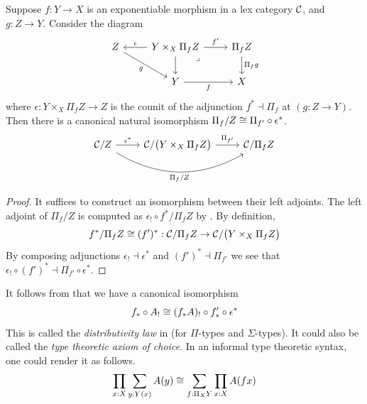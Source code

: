 \begin{lemma} \label{lem:pullback-morphism-action}
  Suppose $f : Y \to X$ is an exponentiable morphism
  in a lex category $\mathcal{C}$,
  and $g : Z \to Y$.
  Consider the diagram
  \[\begin{tikzcd}
    Z & {Y \times_X \Pi_f Z} & {\Pi_f Z} \\
    & Y & X
    \arrow["g"', from=1-1, to=2-2]
    \arrow["{\epsilon}"', from=1-2, to=1-1]
    \arrow["{f'}", from=1-2, to=1-3]
    \arrow[from=1-2, to=2-2]
    \arrow["\lrcorner"{anchor=center, pos=0.125}, draw=none, from=1-2, to=2-3]
    \arrow["{\Pi_f g}", from=1-3, to=2-3]
    \arrow["f"', from=2-2, to=2-3]
  \end{tikzcd}\]
  where $\epsilon : Y \times_X \Pi_f Z \to Z$
  is the counit of the adjunction $f^* \dashv \Pi_f$ at $(g : Z \to Y)$.
  Then there is a canonical natural isomorphism
  $\Pi_f/Z \cong \Pi_{f'} \circ \epsilon^*$.
  \begin{equation} \label{diag:pullback-morphism-action}
    \begin{tikzcd}
      {\CC / Z} & {\CC / \big( Y \times_X \Pi_f Z \big)} & {\CC / \Pi_f Z}
      \arrow["{{\epsilon^*}}", from=1-1, to=1-2]
      \arrow["{{\Pi_{f'}}}", from=1-2, to=1-3]
      \arrow["{{\Pi_f/Z}}"', from=1-1, to=1-3, bend right]
    \end{tikzcd}
  \end{equation}
\end{lemma}
\begin{proof}
  It suffices to construct an isomorphism between their left adjoints.
  The left adjoint of $\Pi_f / Z$ is computed as
  $\epsilon_! \circ f^* / \Pi_f Z$ by .
  By definition,
  \[f^* / \Pi_f Z \cong (f')^* : \mathcal{C} / \Pi_f Z \to \mathcal{C} / \big( Y \times_X \Pi_f Z \big)\]
  By composing adjunctions $\epsilon_! \dashv \epsilon^*$ and $(f')^* \dashv \Pi_{f'}$
  we see that $\epsilon_! \circ (f')^* \dashv \Pi_{f'} \circ \epsilon^*$.
\end{proof}

It follows from  that we have a canonical isomorphism
\begin{equation} \label{eq:type-theoretic-axiom-of-choice}
  f_* \circ A_! \cong (f_* A)_! \circ f'_* \circ \epsilon^* 
\end{equation}
This is called the \emph{distributivity law} in \cite{gambino2013}
(for $\Pi$-types and $\Sigma$-types).
It could also be called the \emph{type theoretic axiom of choice}.
In an informal type theoretic syntax, one could render it as follows.
\[
  \prod_{x : X} \sum_{y : Y(x)} A(y) \cong \sum_{f : \Pi_{X} Y} \prod_{x : X} A(f x)
\]

